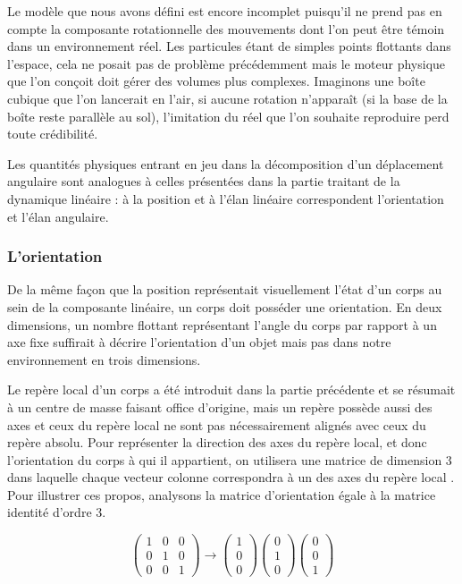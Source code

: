 Le modèle que nous avons défini est encore incomplet puisqu'il ne
prend pas en compte la composante rotationnelle des mouvements dont
l'on peut être témoin dans un environnement réel. Les particules étant
de simples points flottants dans l'espace, cela ne posait pas de
problème précédemment mais le moteur physique que l'on conçoit doit
gérer des volumes plus complexes. Imaginons une boîte cubique que l'on
lancerait en l'air, si aucune rotation n'apparaît (si la base de la
boîte reste parallèle au sol), l'imitation du réel que l'on souhaite
reproduire perd toute crédibilité.

Les quantités physiques entrant en jeu dans la décomposition d'un
déplacement angulaire sont analogues à celles présentées dans la
partie traitant de la dynamique linéaire : à la position et à l'élan
linéaire correspondent l'orientation et l'élan angulaire.

\subsubsection{L'orientation}

De la même façon que la position représentait visuellement l'état d'un
corps au sein de la composante linéaire, un corps doit posséder une
orientation. En deux dimensions, un nombre flottant représentant
l'angle du corps par rapport à un axe fixe suffirait à décrire
l'orientation d'un objet mais pas dans notre environnement en trois
dimensions.

Le repère local d'un corps a été introduit dans la partie précédente
et se résumait à un centre de masse faisant office d'origine, mais un
repère possède aussi des axes et ceux du repère local ne sont pas
nécessairement alignés avec ceux du repère absolu. Pour représenter la
direction des axes du repère local, et donc l'orientation du corps à
qui il appartient, on utilisera une matrice de dimension 3 dans
laquelle chaque vecteur colonne correspondra à un des axes du repère
local \cite{witkit97}. Pour illustrer ces propos, analysons la matrice
d'orientation égale à la matrice identité d'ordre 3.

\[
\begin{pmatrix}
  1 & 0 & 0 \\ 0 & 1 & 0 \\ 0 & 0 & 1
\end{pmatrix}
\rightarrow
\begin{pmatrix}
  1 \\ 0 \\ 0
\end{pmatrix}
\begin{pmatrix}
  0 \\ 1 \\ 0
\end{pmatrix}
\begin{pmatrix}
  0 \\ 0 \\ 1
\end{pmatrix}
\]

